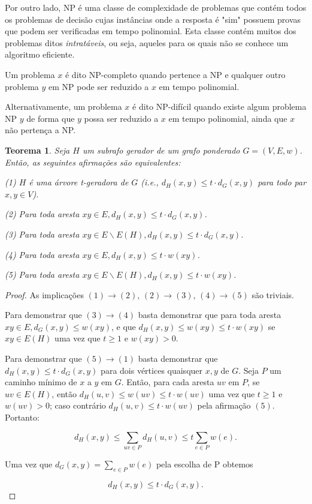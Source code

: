 \documentclass[article,a4paper,12pt,brazil,sumario=tradicional]{abntex2}
\newtheorem{theorem}{Teorema}
\theoremstyle{definition} %
\begin{document}
Por outro lado, NP é uma classe de complexidade de problemas que contém todos os problemas de decisão cujas instâncias onde a resposta é "sim" possuem provas que podem ser verificadas em tempo polinomial. Esta classe contém muitos dos problemas ditos \textit{intratáveis}, ou seja, aqueles para os quais não se conhece um algoritmo eficiente.

Um problema $x$ é dito NP-completo quando pertence a NP e qualquer outro problema $y$ em NP pode ser reduzido a $x$ em tempo polinomial.

Alternativamente, um problema $x$ é dito NP-difícil quando existe algum problema NP $y$ de forma que $y$ possa ser reduzido a $x$ em tempo polinomial, ainda que $x$ não pertença a NP.

\begin{theorem}
Seja $H$ um subrafo gerador de um grafo ponderado $G=(V,E,w)$. Então, as seguintes afirmações são equivalentes\cite{doi:10.1137/S0895480192237403}:

    (1) $H$ é uma árvore t-geradora de $G$ (i.e., $d_H(x,y) \leq t \cdot d_G(x,y)$ para todo par $x,y \in V$).

    (2) Para toda aresta $xy \in E, d_H(x,y) \leq t \cdot d_G(x,y)$.
    
    (3) Para toda aresta $xy \in E \backslash E(H), d_H(x,y) \leq t \cdot d_G(x,y)$.
    
    (4) Para toda aresta $xy \in E, d_H(x,y) \leq t \cdot w(xy)$.
    
    (5) Para toda aresta $xy \in E \backslash E(H), d_H(x,y) \leq t \cdot w(xy)$.

\end{theorem}

\begin{proof}
As implicações $(1) \rightarrow (2)$, $(2) \rightarrow (3)$, $(4) \rightarrow (5)$ são triviais.

Para demonstrar que $(3) \rightarrow (4)$ basta demonstrar que para toda aresta $xy \in E, d_G(x,y) \leq w(xy)$, e que $d_H(x,y) \leq w(xy) \leq t \cdot w(xy)$ se $xy \in E(H)$ uma vez que $t \geq 1$ e $w(xy) > 0$.

Para demonstrar que $(5) \rightarrow (1)$ basta demonstrar que $d_H(x,y) \leq t \cdot d_G(x,y)$ para dois vértices quaisquer $x, y$ de $G$. Seja $P$ um caminho mínimo de $x$ a $y$ em $G$. Então, para cada aresta $uv$ em $P$, se $uv \in E(H)$, então $d_H(u,v) \leq w(uv) \leq t \cdot w(uv)$ uma vez que $t \geq 1$ e $w(uv) > 0$; caso contrário $d_H(u,v) \leq t \cdot w(uv)$ pela afirmação $(5)$. Portanto:

\begin{equation*}
    d_H(x,y) \leq \sum_{uv \in P}d_H(u,v) \leq t \sum_{e \in P}w(e).
\end{equation*}

Uma vez que $d_G(x,y)= \sum_{e \in P}w(e)$ pela escolha de P obtemos

\begin{equation*}
    d_H(x,y) \leq t \cdot d_G(x,y).
\end{equation*}

\end{proof}
\end{document}
